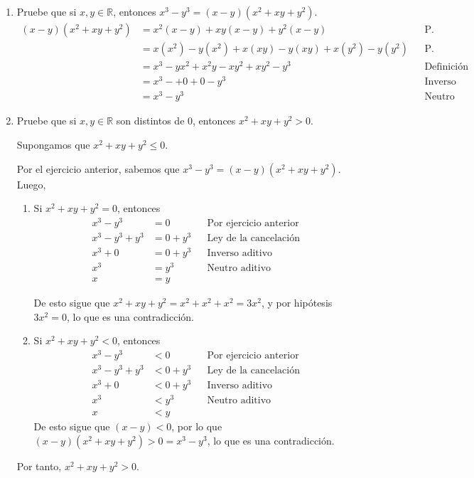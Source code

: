 \documentclass[11pt]{article}
\newcommand{\R}{\mathbb{R}}
\begin{document}
\begin{enumerate}
\begin{enumerate}[label=(\alph*)]
 \end{enumerate}

 \item Pruebe que si $x,y\in \R$, entonces $x^3-y^3=(x-y)(x^2+xy+y^2)$. \begin{align*}
  (x-y)(x^2+xy+y^2) &= x^2(x-y)+xy(x-y)+y^2(x-y) && \text{P. Distributiva}\\
  &= x(x^2)-y(x^2)+x(xy)-y(xy)+x(y^2)-y(y^2) && \text{P. Distributiva}\\
  &= x^3-yx^2+x^2y-xy^2+xy^2-y^3 && \text{Definición}\\
  &= x^3-+0+0-y^3 && \text{Inverso aditivo}\\
  &= x^3-y^3 && \text{Neutro aditivo}
 \end{align*}

 \item Pruebe que si $x,y\in\R$ son distintos de $0$, entonces $x^2+xy+y^2>0$.
 
 Supongamos que $x^2+xy+y^2\leq 0$.

 Por el ejercicio anterior, sabemos que $x^3-y^3=(x-y)(x^2+xy+y^2)$. Luego,\begin{enumerate}[label=\roman*)]
  \item Si $x^2+xy+y^2 =0$, entonces \begin{align*}
   x^3-y^3&=0 && \text{Por ejercicio anterior}\\
   x^3 - y^3 + y^3&=0 + y^3 && \text{Ley de la cancelación}\\
   x^3 + 0 &= 0 + y^3 && \text{Inverso aditivo}\\
   x^3 &= y^3 && \text{Neutro aditivo}\\
   x &= y &&\text{}
  \end{align*}
  
  De esto sigue que $x^2+xy+y^2=x^2+x^2+x^2=3x^2$, y por hipótesis	$3x^2=0$, lo que es una contradicción.
  \item Si $x^2+xy+y^2 <0$, entonces \begin{align*}
   x^3-y^3&<0 && \text{Por ejercicio anterior}\\
   x^3 - y^3 + y^3&<0 + y^3 && \text{Ley de la cancelación}\\
   x^3 + 0 &< 0 + y^3 && \text{Inverso aditivo}\\
   x^3 &< y^3 && \text{Neutro aditivo}\\
   x &< y &&\text{}
  \end{align*}
  De esto sigue que $(x-y)<0$, por lo que $(x-y)(x^2+xy+y^2)>0=x^3-y^3$, lo que es una contradicción.
 \end{enumerate}
 Por tanto, $x^2+xy+y^2>0$.


\end{enumerate}
\end{document}
